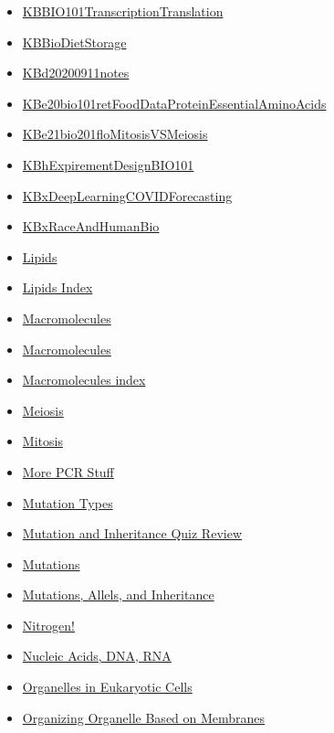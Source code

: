 \documentclass[11pt]{article}
\begin{document}
\begin{itemize}
\begin{itemize}
\item \href{bio101/KBBIO101TranscriptionTranslation.org}{KBBIO101TranscriptionTranslation}
\item \href{bio101/KBBioDietStorage.org}{KBBioDietStorage}
\item \href{bio101/KBd20200911notes.org}{KBd20200911notes}
\item \href{bio101/KBe20bio101retFoodDataProteinEssentialAminoAcids.org}{KBe20bio101retFoodDataProteinEssentialAminoAcids}
\item \href{bio101/KBe21bio201floMitosisVSMeiosis.org}{KBe21bio201floMitosisVSMeiosis}
\item \href{bio101/KBhExpirementDesignBIO101.org}{KBhExpirementDesignBIO101}
\item \href{bio101/KBxDeepLearningCOVIDForecasting.org}{KBxDeepLearningCOVIDForecasting}
\item \href{bio101/KBxRaceAndHumanBio.org}{KBxRaceAndHumanBio}
\item \href{bio101/KBhBIO101Lipids.org}{Lipids}
\item \href{bio101/KBe2020bio101refLipids.org}{Lipids Index}
\item \href{bio101/KBhBIO101Macromolecules.org}{Macromolecules}
\item \href{bio101/KBMacromelecules.org}{Macromolecules}
\item \href{bio101/KBe2020bio101refMacromolecules.org}{Macromolecules index}
\item \href{bio101/KBhBIO101Meiosis.org}{Meiosis}
\item \href{bio101/KBhBIO101Mitosis.org}{Mitosis}
\item \href{bio101/KBhBIO101MorePCRStuff.org}{More PCR Stuff}
\item \href{bio101/KBrefMutationTypes.org}{Mutation Types}
\item \href{bio101/KBhBIO101MutationInheritanceQuizReview.org}{Mutation and Inheritance Quiz Review}
\item \href{bio101/KBhBIO101Mutations.org}{Mutations}
\item \href{bio101/KBhBIO101MutationsAllealsInheritance.org}{Mutations, Allels, and Inheritance}
\item \href{bio101/KBNitrogen.org}{Nitrogen!}
\item \href{bio101/KBhBIO101NucleicAcidsDNARNA.org}{Nucleic Acids, DNA, RNA}
\item \href{bio101/KBhBIO101EukaryoticOrganells.org}{Organelles in Eukaryotic Cells}
\item \href{bio101/KBhBIO101OrganellsBasedOnMembranes.org}{Organizing Organelle Based on Membranes}

\end{itemize}
\end{itemize}
\end{document}
